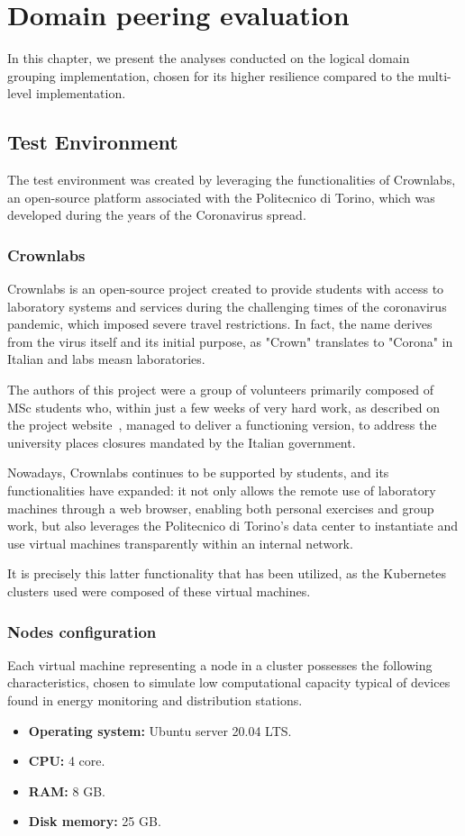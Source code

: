 \chapter{Domain peering evaluation}
In this chapter, we present the analyses conducted on the logical domain grouping implementation, chosen for its higher resilience compared to the multi-level implementation.

\section{Test Environment}
The test environment was created by leveraging the functionalities of Crownlabs, an open-source platform associated with the Politecnico di Torino, which was developed during the years of the Coronavirus spread.

\subsection{Crownlabs}
Crownlabs is an open-source project created to provide students with access to laboratory systems and services during the challenging times of the coronavirus pandemic, which imposed severe travel restrictions. In fact, the name derives from the virus itself and its initial purpose, as "Crown" translates to "Corona" in Italian and labs measn laboratories.

The authors of this project were a group of volunteers primarily composed of MSc students who, within just a few weeks of very hard work, as described on the project website~\cite{e1-1}, managed to deliver a functioning version, to address the university places closures mandated by the Italian government.

Nowadays, Crownlabs continues to be supported by students, and its functionalities have expanded: it not only allows the remote use of laboratory machines through a web browser, enabling both personal exercises and group work, but also leverages the Politecnico di Torino's data center to instantiate and use virtual machines transparently within an internal network.

It is precisely this latter functionality that has been utilized, as the Kubernetes clusters used were composed of these virtual machines.

\subsection{Nodes configuration}
Each virtual machine representing a node in a cluster possesses the following characteristics, chosen to simulate low computational capacity typical of devices found in energy monitoring and distribution stations.
\begin{itemize}
\item \textbf{Operating system:}  Ubuntu server 20.04 LTS.
\item \textbf{CPU:} 4 core.
\item \textbf{RAM:} 8 GB.
\item \textbf{Disk memory:} 25 GB.
\end{itemize}

